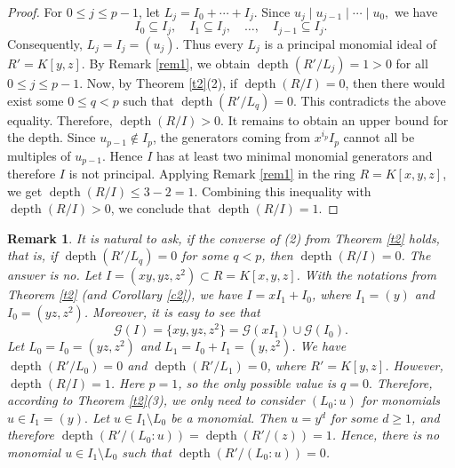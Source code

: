 \documentclass[11pt]{amsart}
\newtheorem{remark}[theorem]{Remark}
\def\depth{\operatorname{depth}}
\begin{document}
\begin{proof}

For $0\leq j\leq p-1$, let $L_j=I_0+\cdots+I_j.$ Since
 $u_j\mid u_{j-1}\mid\cdots\mid u_0,$ we have
\[
I_0\subseteq I_j,\quad I_1\subseteq I_j,\quad\ldots,\quad I_{j-1}\subseteq I_j.
\]
Consequently, $L_j=I_j=(u_j).$ Thus every $L_j$ is a principal monomial ideal of
 $R'=K[y,z].$ By Remark \ref{rem1}, we obtain $\depth(R'/L_j)=1>0$ for all $0\leq j\leq p-1$. 
Now, by Theorem \ref{t2}(2), if $\depth(R/I)=0$, then there would exist
some $0\leq q<p$ such that $\depth(R'/L_q)=0.$ This contradicts the above equality. Therefore,
 $\depth(R/I)>0.$ It remains to obtain an upper bound for the depth. Since
$u_{p-1}\notin I_p$, the generators coming from $x^{i_p}I_p$ cannot all
be multiples of $u_{p-1}$. Hence $I$ has at least two minimal monomial
generators and therefore $I$ is not principal. Applying Remark \ref{rem1}
in the ring $R=K[x,y,z]$, we get $\depth(R/I)\leq 3-2=1.$ 
Combining this inequality with $\depth(R/I)>0$, we conclude that 
$\depth(R/I)=1.$ 
\end{proof}



\begin{remark}
It is natural to ask, if the converse of (2) from Theorem \ref{t2} holds, that is, if $\depth(R'/L_q)=0$  for some $q<p$, then
$\depth(R/I)=0$. The answer is no. Let $I=(xy,yz,z^2)\subset R=K[x,y,z]$. With the notations from Theorem \ref{t2} (and Corollary \ref{c2}),
we have $I=xI_1+I_0$, where $I_1=(y)$ and $I_0=(yz,z^2)$. Moreover, it is easy to see that 
$$\mathcal{G}(I)=\{xy,yz,z^2\}=\mathcal{G}(xI_1)\cup\mathcal{G}(I_0).$$
Let $L_0=I_0=(yz,z^2)$ and $L_1=I_0+I_1=(y,z^2)$. We have $\depth(R'/L_0)=0$
and $\depth(R'/L_1)=0$, where $R'=K[y,z]$.  However, $\depth(R/I)=1$. 
Here $p=1$, so the only possible value is $q=0.$ Therefore, according to Theorem \ref{t2}(3), we only need to consider
 $(L_0:u)$ for monomials $u\in I_1=(y).$ Let $u\in I_1\setminus L_0$ be a monomial. Then $u=y^d$  for some $d\geq 1$,
and therefore $\depth(R'/(L_0:u))=\depth(R'/(z))=1$. Hence, there is no monomial $u\in I_1\setminus L_0$ such that
 $\depth(R'/(L_0:u))=0$. 
\end{remark}
\end{document}

